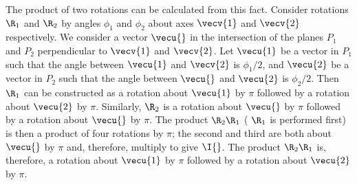 The product of two rotations can be calculated from this fact. Consider rotations  $\R_{1}$ and  $\R_{2}$ by angles $\phi_{1}$ and $\phi_{2}$ about axes $\vecv{1}$ and $\vecv{2}$ respectively. We consider a vector $\vecu{}$ in the intersection of the planes $P_{1}$ and $P_{2}$ perpendicular to $\vecv{1}$ and $\vecv{2}$. Let $\vecu{1}$ be a vector in $P_{1}$ such that the angle between $\vecu{1}$ and $\vecv{2}$ is $\phi_{1}/2$, and $\vecu{2}$ be a vector in $P_{2}$ such that the angle between $\vecu{}$ and $\vecu{2}$ is $\phi_{2}/2$. Then  $\R_{1}$ can be constructed as a rotation about $\vecu{1}$ by $\pi$ followed by a rotation about $\vecu{2}$ by $\pi$. Similarly,  $\R_{2}$ is a rotation about $\vecu{}$ by $\pi$ followed by a rotation about $\vecu{}$ by $\pi$.	The product  $\R_{2}\R_{1}$ ( $\R_{1}$ is performed first) is then a product of four rotations by $\pi$; the second and third are both about $\vecu{}$ by $\pi$ and, therefore, multiply to give $\I{}$. The product  $\R_{2}\R_{1}$ is, therefore, a rotation about $\vecu{1}$ by $\pi$ followed by a rotation about $\vecu{2}$ by $\pi$.


\endinput